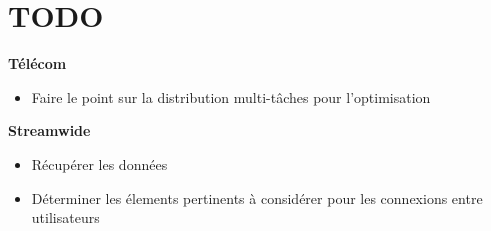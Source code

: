 \documentclass[a4paper]{article}
\begin{document}
\section*{TODO}
\label{sec:todo}
\begin{description}
    \item \textbf{T\'el\'ecom}
    \begin{itemize}
        \item Faire le point sur la distribution multi-t\^aches pour l'optimisation
    \end{itemize}
    \item \textbf{Streamwide}
    \begin{itemize}
        \item R\'ecup\'erer les donn\'ees
        \item D\'eterminer les \'elements pertinents à consid\'erer pour les connexions
            entre utilisateurs
    \end{itemize}
\end{description}
\end{document}
